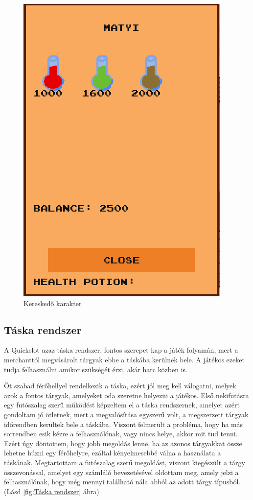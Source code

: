 \begin{figure}[H]
    \centering
    \includegraphics[width=8.0truecm]{images/merchant.png}
    \caption{Kereskedő karakter}
    \label{fig:Merchant}
\end{figure}


\subsection{Táska rendszer}

 A Quickslot azaz táska rendszer, fontos szerepet kap a játék folyamán, mert a merchanttól megvásárolt tárgyak ebbe a táskába kerülnek bele. A játékos ezeket tudja felhasználni amikor szükségét érzi, akár harc közben is.

Öt szabad férőhellyel rendelkezik a táska, ezért jól meg kell válogatni, melyek azok a fontos tárgyak, amelyeket oda szeretne helyezni a játékos. Első nekifutásra egy futószalag szerű működést képzeltem el a táska rendszernek, amelyet azért gondoltam jó ötletnek, mert a megvalósítása egyszerű volt, a megszerzett tárgyak időrendben kerültek bele a táskába. Viszont felmerült a probléma, hogy ha más sorrendben esik kézre a felhasználónak, vagy nincs helye, akkor mit tud tenni. Ezért úgy döntöttem, hogy jobb megoldás lenne, ha az azonos tárgyakkat össze lehetne húzni egy férőhelyre, ezáltal kényelmesebbé válna a használata a táskának. Megtartottam a futószalag szerű megoldást, viszont kiegészült a tárgy összevonással, amelyet egy számláló bevezetésével oldottam meg, amely jelzi a felhasználónak, hogy még mennyi található nála abból az adott tárgy típusból. (Lásd \ref{fig:Táska rendszer} ábra)

